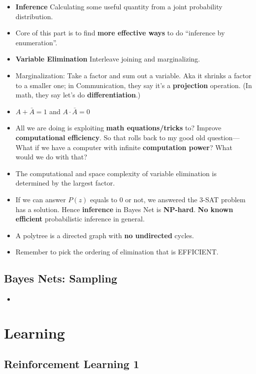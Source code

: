 \documentclass[twocolumn]{article}
\begin{document}
\begin{itemize}
\item \textbf{Inference} Calculating some useful quantity from a joint
  probability distribution.
\item Core of this part is to find \textbf{more effective ways} to do
  ``inference by enumeration''.
\item \textbf{Variable Elimination} Interleave joining and
  marginalizing. 
\item Marginalization: Take a factor and sum out a variable. Aka it
  shrinks a factor to a smaller one; in Communication, they say it's a
  \textbf{projection} operation. (In math, they say let's do
  \textbf{differentiation}.) 
\item $A+\bar{A}=1$ and $A\cdot\bar{A}=0$
\item All we are doing is exploiting \textbf{math equations/tricks}
  to? Improve \textbf{computational efficiency}. So that rolls back to
  my good old question---What if we have a computer with infinite
  \textbf{computation power}? What would we do with that?
\item The computational and space complexity of variable elimination
  is determined by the largest factor.
\item If we can answer $P(z)$ equals to $0$ or not, we answered the
  3-SAT problem has a solution. Hence \textbf{inference} in Bayes Net
  is \textbf{NP-hard}. \textbf{No known efficient} probabilistic
  inference in general.
\item A polytree is a directed graph with \textbf{no undirected}
  cycles. 
\item Remember to pick the ordering of elimination that is EFFICIENT.
\end{itemize}

\subsection{Bayes Nets: Sampling}
\label{sec:bayes-nets:-sampling}

\begin{itemize}
\item 
\end{itemize}

\section{Learning}
\label{sec:learning}


\subsection{Reinforcement Learning 1}
\label{sec:reinf-learn-1}
\end{document}
